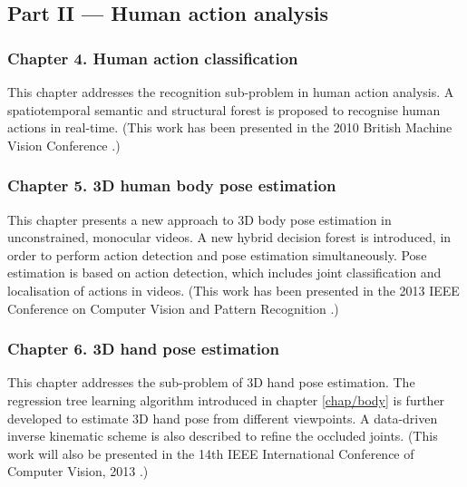 \subsection*{Part II --- Human action analysis}


\subsubsection*{Chapter 4. Human action classification} 
This chapter addresses the recognition sub-problem in human action analysis. A spatiotemporal semantic and structural forest is proposed to recognise human actions in real-time.    
(This work has been presented in the 2010 British Machine Vision Conference \cite{Yu2010}.)  

\subsubsection*{Chapter 5. 3D human body pose estimation} 
This chapter presents a new approach to 3D body pose estimation in unconstrained, monocular videos. 
A new hybrid decision forest is introduced, in order to perform action detection and pose estimation simultaneously. 
Pose estimation is based on action detection, which includes joint classification and localisation of actions in videos. 
(This work has been presented in the 2013 IEEE Conference on Computer Vision and Pattern Recognition \cite{Yu2013}.)  

\subsubsection*{Chapter 6. 3D hand pose estimation} 
This chapter addresses the sub-problem of 3D hand pose estimation. 
The regression tree learning algorithm introduced in chapter \ref{chap/body} is further developed to estimate 3D hand pose from different viewpoints. 
A data-driven inverse kinematic scheme is also described to refine the occluded joints.
(This work will also be presented in the 14th IEEE International Conference of Computer Vision, 2013 \cite{Tang2013}.)
